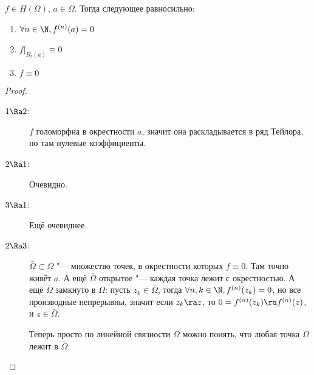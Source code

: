 \begin{theorem}
	$f \in H(\Omega)$, $a \in \Omega$.
	Тогда следующее равносильно:
	\begin{enumerate}
		\item $\forall n \in \N, f^{(n)}(a) = 0$
		\item $f\bigr|_{B_r(a)} \equiv 0$
		\item $f \equiv 0$
	\end{enumerate}
\end{theorem}
\begin{proof}\begin{description}
\item[$1 \Ra 2$:]
	$f$ голоморфна в окрестности $a$, значит она раскладывается в ряд Тейлора, но там нулевые коэффициенты.

\item[$2 \Ra 1$:]
	Очевидно.

\item[$3 \Ra 1$:]
	Ещё очевиднее.

\item[$2 \Ra 3$:]
	$\bar \Omega \subset \Omega$ "--- множество точек, в окрестности которых $f \equiv 0$.
	Там точно живёт $a$.
	А ещё $\bar \Omega$ открытое "--- каждая точка лежит с окрестностью.
	А ещё $\bar \Omega$ замкнуто в $\Omega$: пусть $z_k \in \bar \Omega$, тогда $\forall n,k \in \N, f^{(n)}(z_k) = 0$,
	но все производные непрерывны, значит если $z_k \ra z$, то $0 = f^{(n)}(z_k) \ra f^{(n)}(z)$, и $z \in \bar \Omega$.

	Теперь просто по линейной связности $\Omega$ можно понять, что любая точка $\Omega$ лежит в $\bar \Omega$.
\end{description}\end{proof}
